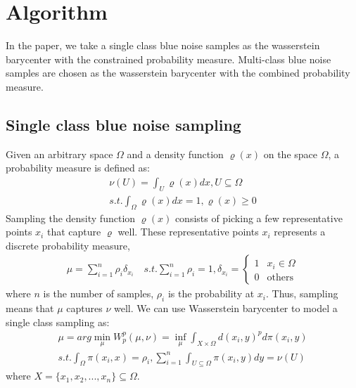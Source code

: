\section{Algorithm}

In the paper,
we take a single class blue noise samples  as the wasserstein barycenter with the constrained probability measure.
Multi-class blue noise samples are chosen as the wasserstein barycenter with the combined probability measure.
\subsection{Single class blue noise sampling}
Given an arbitrary space $\Omega$ and a density function $\varrho(x)$ on the space $\Omega$,
a probability measure is defined as:
\begin{equation}\label{probability-measure}
  \begin{split}
  \nu(U)=\int_U\varrho(x)dx, U\subseteq\Omega \\
  s.t. \int_{\Omega}\varrho(x)dx=1,\varrho(x)\geq0
  \end{split}
\end{equation}
Sampling the density function $\varrho(x)$ consists of picking a few representative points $x_i$
that capture $\varrho$ well.
These representative points $x_i$ represents a discrete probability measure,
\begin{equation*}
\begin{split}
  \mu=\sum\limits_{i=1}^n\rho_i\delta_{x_i} \quad
  s.t. \sum\limits_{i=1}^n\rho_i=1,  \delta_{x_i}= \left\{ \begin{array}{ll}
  1 & x_i\in\Omega\\
  0 & \textrm{others}
  \end{array} \right.
  \end{split}
\end{equation*}
where $n$ is the number of samples,
$\rho_i$ is the probability at $x_i$.
Thus,
sampling means that $\mu$ captures $\nu$ well.
We can use Wasserstein barycenter to model a single class sampling as:
\begin{equation}\label{single-class-problem}
\begin{split}
 \mu=arg\min\limits_\mu W_p^p(\mu,\nu)=\inf\limits_\mu\int_{X\times\Omega}d(x_i,y)^pd\pi(x_i,y)\\
 s.t. \int_\Omega\pi(x_i,x)=\rho_i, \sum\limits_{i=1}^n\int_{U\subseteq\Omega}\pi(x_i,y)dy=\nu(U)
 \end{split}
\end{equation}
where $X=\{x_1,x_2,...,x_n\}\subseteq\Omega$.

